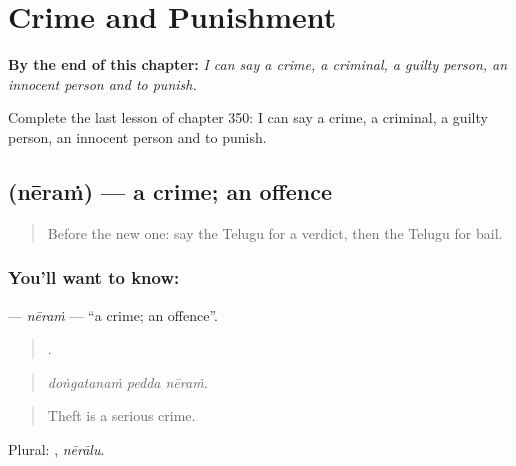 
\chapter{Crime and Punishment}
\label{ch:te-crime-and-punishment}

\begin{chapteropening}
\textbf{By the end of this chapter:} \emph{I can say a crime, a criminal, a guilty person, an innocent person and to punish.}

Complete the last lesson of chapter 350: I can say a crime, a criminal, a guilty person, an innocent person and to punish.
\end{chapteropening}

\section[\texorpdfstring{\te{నేరం} (nēraṁ)}{నేరం (nēraṁ)}]{ (nēraṁ) — a crime; an offence}

\label{lesson:TE-C350-neram}



\begin{quote}
Before the new one: say the Telugu for a verdict, then the Telugu for bail.
\end{quote}

\subsection*{You'll want to know: }
\textbf{} — \emph{nēraṁ} — \textquotedblleft{}a crime; an offence\textquotedblright{}.

\begin{quote}
  .
\end{quote}

\begin{quote}
\emph{doṅgatanaṁ pedda nēraṁ.}
\end{quote}

\begin{quote}
Theft is a serious crime.
\end{quote}

Plural: , \emph{nērālu}.

